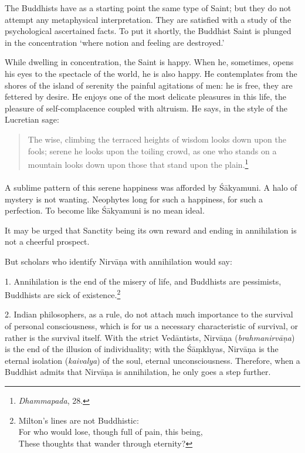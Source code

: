 \documentclass[a4paper, 11pt, oneside, english]{article}
\begin{document}
The Buddhists have as a starting point the same type of Saint; but they do not attempt any metaphysical interpretation. They are satisfied with a study of the psychological ascertained facts. To put it shortly, the Buddhist Saint is plunged in the concentration `where notion and feeling are destroyed.'

While dwelling in concentration, the Saint is happy. When he, sometimes, opens his eyes to the spectacle of the world, he is also happy. He contemplates from the shores of the island of serenity the painful agitations of men: he is free, they are fettered by desire. He enjoys one of the most delicate pleasures in this life, the pleasure of self-complacence coupled with altruism. He says, in the style of the Lucretian sage:
\begin{quotation}
\small
The wise, climbing the terraced heights of wisdom looks down upon the fools; serene he looks upon the toiling crowd, as one who stands on a mountain looks down upon those that stand upon the plain.\footnote{\emph{Dhammapada}, 28.}
\end{quotation}
\paragraph{}
A sublime pattern of this serene happiness was afforded by Śākyamuni. A halo of mystery is not wanting. Neophytes long for such a happiness, for such a perfection. To become like Śākyamuni is no mean ideal.

It may be urged that Sanctity being its own reward and ending in annihilation is not a cheerful prospect.

But scholars who identify Nirvāṇa with annihilation would say:

1. Annihilation is the end of the misery of life, and Buddhists are pessimists, Buddhists are sick of existence.\footnote{Milton's lines are not Buddhistic:\\\hspace*{10mm}For who would lose, though full of pain, this being,\\\hspace*{10mm}These thoughts that wander through eternity?}

2. Indian philosophers, as a rule, do not attach much importance to the survival of personal consciousness, which is for us a necessary characteristic of survival, or rather is the survival itself. With the strict Vedāntists, Nirvāṇa (\emph{brahmanirvāṇa}) is the end of the illusion of individuality; with the Śāṃkhyas, Nirvāṇa is the eternal isolation (\emph{kaivalya}) of the soul, eternal unconsciousness. Therefore, when a Buddhist admits that Nirvāṇa is annihilation, he only goes a step further.
\end{document}

